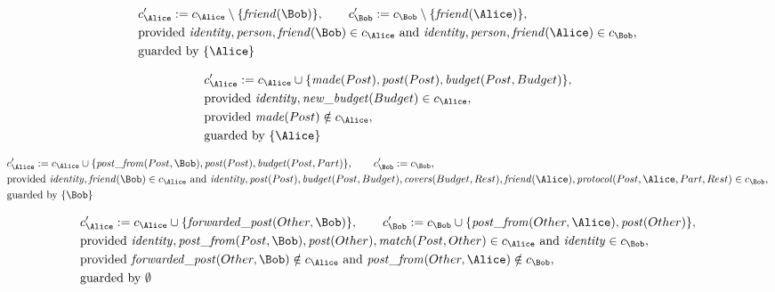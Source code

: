 \begin{align*}
&
c'_
{
\Alice
}
 := 
c_
{
\Alice
}
 \setminus 
\{
\mathit{\detokenize{
friend
}}
(
\Bob
)
\}
, \qquad 
c'_
{
\Bob
}
 := 
c_
{
\Bob
}
 \setminus 
\{
\mathit{\detokenize{
friend
}}
(
\Alice
)
\}
,\\
&
\text{provided } 
\mathit{\detokenize{
identity
}}
,
\mathit{\detokenize{
person
}}
,
\mathit{\detokenize{
friend
}}
(
\Bob
)
 \in c_
{
\Alice
}
 \text{ and } 
\mathit{\detokenize{
identity
}}
,
\mathit{\detokenize{
person
}}
,
\mathit{\detokenize{
friend
}}
(
\Alice
)
 \in c_
{
\Bob
}
,\\
&
\text{guarded by } \{
\Alice
\}
\end{align*}

\begin{align*}
&
c'_
{
\Alice
}
 := 
c_
{
\Alice
}
 \cup 
\{
\mathit{\detokenize{
made
}}
(
Post
)
,
\mathit{\detokenize{
post
}}
(
Post
)
,
\mathit{\detokenize{
budget
}}
(
Post
,
Budget
)
\}
,\\
&
\text{provided } 
\mathit{\detokenize{
identity
}}
,
\mathit{\detokenize{
new_budget
}}
(
Budget
)
 \in c_
{
\Alice
}
,\\
&
\text{provided } 
\mathit{\detokenize{
made
}}
(
Post
)
 \notin c_
{
\Alice
}
,\\
&
\text{guarded by } \{
\Alice
\}
\end{align*}

\begin{align*}
&
c'_
{
\Alice
}
 := 
c_
{
\Alice
}
 \cup 
\{
\mathit{\detokenize{
post_from
}}
(
Post
,
\Bob
)
,
\mathit{\detokenize{
post
}}
(
Post
)
,
\mathit{\detokenize{
budget
}}
(
Post
,
Part
)
\}
, \qquad 
c'_
{
\Bob
}
 := 
c_
{
\Bob
}
,\\
&
\text{provided } 
\mathit{\detokenize{
identity
}}
,
\mathit{\detokenize{
friend
}}
(
\Bob
)
 \in c_
{
\Alice
}
 \text{ and } 
\mathit{\detokenize{
identity
}}
,
\mathit{\detokenize{
post
}}
(
Post
)
,
\mathit{\detokenize{
budget
}}
(
Post
,
Budget
)
,
\mathit{\detokenize{
covers
}}
(
Budget
,
Rest
)
,
\mathit{\detokenize{
friend
}}
(
\Alice
)
,
\mathit{\detokenize{
protocol
}}
(
Post
,
\Alice
,
Part
,
Rest
)
 \in c_
{
\Bob
}
,\\
&
\text{guarded by } \{
\Bob
\}
\end{align*}

\begin{align*}
&
c'_
{
\Alice
}
 := 
c_
{
\Alice
}
 \cup 
\{
\mathit{\detokenize{
forwarded_post
}}
(
Other
,
\Bob
)
\}
, \qquad 
c'_
{
\Bob
}
 := 
c_
{
\Bob
}
 \cup 
\{
\mathit{\detokenize{
post_from
}}
(
Other
,
\Alice
)
,
\mathit{\detokenize{
post
}}
(
Other
)
\}
,\\
&
\text{provided } 
\mathit{\detokenize{
identity
}}
,
\mathit{\detokenize{
post_from
}}
(
Post
,
\Bob
)
,
\mathit{\detokenize{
post
}}
(
Other
)
,
\mathit{\detokenize{
match
}}
(
Post
,
Other
)
 \in c_
{
\Alice
}
 \text{ and } 
\mathit{\detokenize{
identity
}}
 \in c_
{
\Bob
}
,\\
&
\text{provided } 
\mathit{\detokenize{
forwarded_post
}}
(
Other
,
\Bob
)
 \notin c_
{
\Alice
}
 \text{ and } 
\mathit{\detokenize{
post_from
}}
(
Other
,
\Alice
)
 \notin c_
{
\Bob
}
,\\
&
\text{guarded by } \emptyset
\end{align*}
